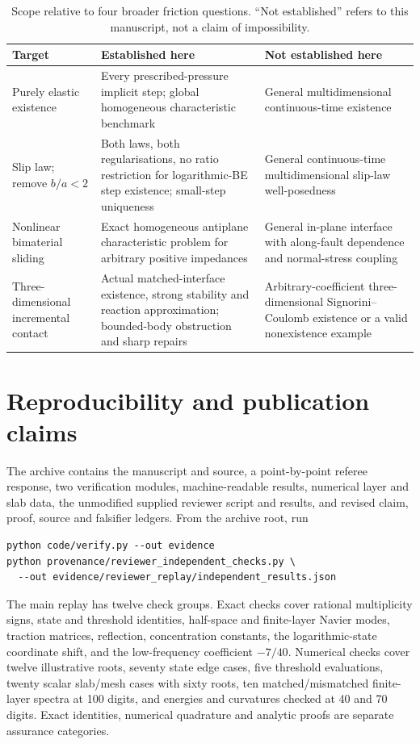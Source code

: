 \documentclass[11pt,a4paper]{article}
\theoremstyle{definition}\newtheorem{definition}[theorem]{Definition}
\theoremstyle{remark}\newtheorem{remark}[theorem]{Remark}
\numberwithin{equation}{section}
\begin{document}
\begin{table}[ht]
\centering\small
\caption{Scope relative to four broader friction questions. ``Not established'' refers to this manuscript, not a claim of impossibility.}
\begin{tabular}{>{\raggedright\arraybackslash}p{.24\linewidth}>{\raggedright\arraybackslash}p{.38\linewidth}>{\raggedright\arraybackslash}p{.29\linewidth}}
\toprule
Target & Established here & Not established here\\\midrule
Purely elastic existence & Every prescribed-pressure implicit step; global homogeneous characteristic benchmark & General multidimensional continuous-time existence\\[4pt]
Slip law; remove $b/a<2$ & Both laws, both regularisations, no ratio restriction for logarithmic-BE step existence; small-step uniqueness & General continuous-time multidimensional slip-law well-posedness\\[4pt]
Nonlinear bimaterial sliding & Exact homogeneous antiplane characteristic problem for arbitrary positive impedances & General in-plane interface with along-fault dependence and normal-stress coupling\\[4pt]
Three-dimensional incremental contact & Actual matched-interface existence, strong stability and reaction approximation; bounded-body obstruction and sharp repairs & Arbitrary-coefficient three-dimensional Signorini--Coulomb existence or a valid nonexistence example\\\bottomrule
\end{tabular}
\end{table}

\section{Reproducibility and publication claims}\label{sec:repro}
The archive contains the manuscript and source, a point-by-point referee response, two verification modules, machine-readable results, numerical layer and slab data, the unmodified supplied reviewer script and results, and revised claim, proof, source and falsifier ledgers. From the archive root, run
\begin{minipage}{\linewidth}
\begin{verbatim}
python code/verify.py --out evidence
python provenance/reviewer_independent_checks.py \
  --out evidence/reviewer_replay/independent_results.json
\end{verbatim}
\end{minipage}
The main replay has twelve check groups. Exact checks cover rational multiplicity signs, state and threshold identities, half-space and finite-layer Navier modes, traction matrices, reflection, concentration constants, the logarithmic-state coordinate shift, and the low-frequency coefficient $-7/40$. Numerical checks cover twelve illustrative roots, seventy state edge cases, five threshold evaluations, twenty scalar slab/mesh cases with sixty roots, ten matched/mismatched finite-layer spectra at 100 digits, and energies and curvatures checked at 40 and 70 digits. Exact identities, numerical quadrature and analytic proofs are separate assurance categories.
\end{document}

